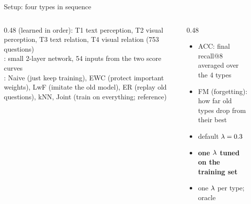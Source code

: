\documentclass[aspectratio=169,11pt]{beamer}
\begin{document}
\begin{frame}{Setup: four types in sequence}
  \small
  \begin{columns}[T,onlytextwidth]
    \begin{column}{0.48\textwidth}
       (learned in order): T1 text perception, T2 visual perception, T3 text relation, T4 visual relation (753 questions)\\[1mm]
      : small 2-layer network, 54 inputs from the two score curves\\[1mm]
      : Naive (just keep training), EWC (protect important weights), LwF (imitate the old model), ER (replay old questions), kNN, Joint (train on everything; reference)
    \end{column}
    \begin{column}{0.48\textwidth}
      \begin{itemize}
        \item ACC: final recall@8 averaged over the 4 types
        \item FM (forgetting): how far old types drop from their best
      \end{itemize}
      \begin{itemize}
        \item default $\lambda=0.3$
        \item \textbf{one $\lambda$ tuned on the training set}
        \item one $\lambda$ per type; oracle
      \end{itemize}
    \end{column}
  \end{columns}
\end{frame}
\end{document}
